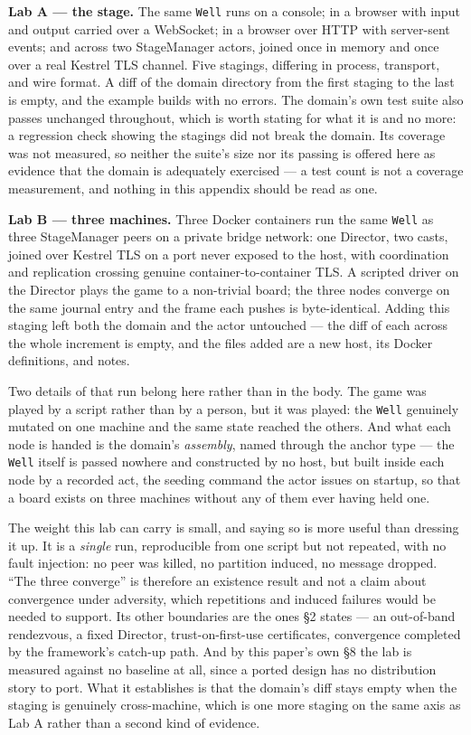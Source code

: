 \documentclass[
]{article}
\begin{document}
\textbf{Lab A --- the stage.} The same \texttt{Well} runs on a console;
in a browser with input and output carried over a WebSocket; in a
browser over HTTP with server-sent events; and across two StageManager
actors, joined once in memory and once over a real Kestrel TLS channel.
Five stagings, differing in process, transport, and wire format. A diff
of the domain directory from the first staging to the last is empty, and
the example builds with no errors. The domain's own test suite also
passes unchanged throughout, which is worth stating for what it is and
no more: a regression check showing the stagings did not break the
domain. Its coverage was not measured, so neither the suite's size nor
its passing is offered here as evidence that the domain is adequately
exercised --- a test count is not a coverage measurement, and nothing in
this appendix should be read as one.

\textbf{Lab B --- three machines.} Three Docker containers run the same
\texttt{Well} as three StageManager peers on a private bridge network:
one Director, two casts, joined over Kestrel TLS on a port never exposed
to the host, with coordination and replication crossing genuine
container-to-container TLS. A scripted driver on the Director plays the
game to a non-trivial board; the three nodes converge on the same
journal entry and the frame each pushes is byte-identical. Adding this
staging left both the domain and the actor untouched --- the diff of
each across the whole increment is empty, and the files added are a new
host, its Docker definitions, and notes.

Two details of that run belong here rather than in the body. The game
was played by a script rather than by a person, but it was played: the
\texttt{Well} genuinely mutated on one machine and the same state
reached the others. And what each node is handed is the domain's
\emph{assembly}, named through the anchor type --- the \texttt{Well}
itself is passed nowhere and constructed by no host, but built inside
each node by a recorded act, the seeding command the actor issues on
startup, so that a board exists on three machines without any of them
ever having held one.

The weight this lab can carry is small, and saying so is more useful
than dressing it up. It is a \emph{single} run, reproducible from one
script but not repeated, with no fault injection: no peer was killed, no
partition induced, no message dropped. ``The three converge'' is
therefore an existence result and not a claim about convergence under
adversity, which repetitions and induced failures would be needed to
support. Its other boundaries are the ones §2 states --- an out-of-band
rendezvous, a fixed Director, trust-on-first-use certificates,
convergence completed by the framework's catch-up path. And by this
paper's own §8 the lab is measured against no baseline at all, since a
ported design has no distribution story to port. What it establishes is
that the domain's diff stays empty when the staging is genuinely
cross-machine, which is one more staging on the same axis as Lab A
rather than a second kind of evidence.
\end{document}
